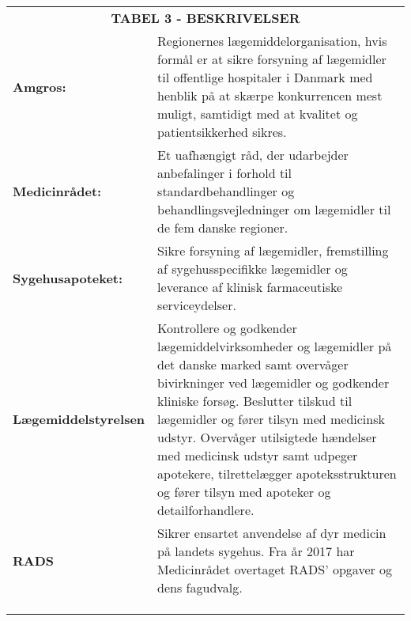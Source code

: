 \begin{table}[H]
\label{table:beskrivelser}
\vspace{0.5cm}
\begin{tabular}{p{4.5cm} p{9.8cm}}
\multicolumn{2}{c}{\cellcolor[HTML]{C0C0C0}\textbf{TABEL 3 - BESKRIVELSER}} \vspace{0.5cm} \\
\textbf{Amgros:} & Regionernes lægemiddelorganisation, hvis formål er at sikre forsyning af lægemidler til offentlige hospitaler i Danmark med henblik på at skærpe konkurrencen mest muligt, samtidigt med at kvalitet og patientsikkerhed sikres. \vspace{0.5cm}
\\ 
\textbf{Medicinrådet:} & Et uafhængigt råd, der udarbejder anbefalinger i forhold til standardbehandlinger og behandlingsvejledninger om lægemidler til de fem danske regioner. \vspace{0.5cm} \\
\textbf{Sygehusapoteket:} & Sikre forsyning af lægemidler,
fremstilling af sygehusspecifikke lægemidler og leverance af klinisk farmaceutiske serviceydelser. \vspace{0.5cm} \\
\textbf{Lægemiddelstyrelsen} & Kontrollere og godkender lægemiddelvirksomheder og lægemidler på det danske marked samt overvåger bivirkninger ved lægemidler og godkender kliniske forsøg. Beslutter tilskud til lægemidler og fører tilsyn med medicinsk udstyr. Overvåger utilsigtede hændelser med medicinsk udstyr samt udpeger apotekere, tilrettelægger apoteksstrukturen og fører tilsyn med apoteker og detailforhandlere.\vspace{0.5cm} \\
\textbf{RADS} & Sikrer ensartet anvendelse af dyr medicin på landets sygehus. Fra år 2017 har Medicinrådet overtaget RADS' opgaver og dens fagudvalg. \vspace{0.5cm} \\
& \vspace{0.5cm} \\
& \vspace{0.5cm} \\
& \vspace{0.5cm} \\
\end{tabular}
\end{table}




